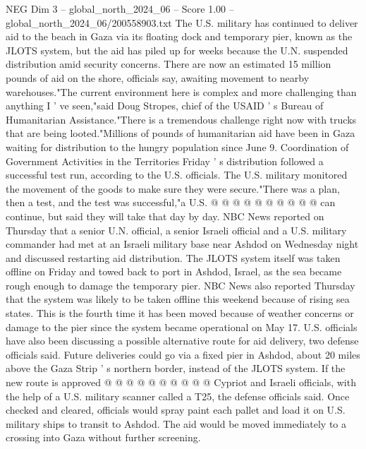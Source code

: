 \begin{textsample}{NEG Dim 3 – global\_north\_2024\_06 – Score 1.00 – global\_north\_2024\_06/200558903.txt}  \label{ex:f3_neg_381}
The U.S. military has continued to deliver aid to the beach in Gaza via its floating dock and temporary pier, known as the JLOTS system, but the aid has piled up for weeks because the U.N. suspended distribution amid security concerns.
There are now an estimated 15 million pounds of aid on the shore, officials say, awaiting movement to nearby warehouses."The current environment here is complex and more challenging than anything I ' ve seen,"said Doug Stropes, chief of the USAID ' s Bureau of Humanitarian Assistance."There is a tremendous challenge right now with trucks that are being looted."Millions of pounds of humanitarian aid have been in Gaza waiting for distribution to the hungry population since June 9.
Coordination of Government Activities in the Territories Friday ' s distribution followed a successful test run, according to the U.S. officials.
The U.S. military monitored the movement of the goods to make sure they were secure."There was a plan, then a test, and the test was successful,"a U.S. @ @ @ @ @ @ @ @ @ @ can continue, but said they will take that day by day.
NBC News reported on Thursday that a senior U.N. official, a senior Israeli official and a U.S. military commander had met at an Israeli military base near Ashdod on Wednesday night and discussed restarting aid distribution.
The JLOTS system itself was taken offline on Friday and towed back to port in Ashdod, Israel, as the sea became rough enough to damage the temporary pier.
NBC News also reported Thursday that the system was likely to be taken offline this weekend because of rising sea states.
This is the fourth time it has been moved because of weather concerns or damage to the pier since the system became operational on May 17.
U.S. officials have also been discussing a possible alternative route for aid delivery, two defense officials said.
Future deliveries could go via a fixed pier in Ashdod, about 20 miles above the Gaza Strip ' s northern border, instead of the JLOTS system.
If the new route is approved @ @ @ @ @ @ @ @ @ @ Cypriot and Israeli officials, with the help of a U.S. military scanner called a T25, the defense officials said.
Once checked and cleared, officials would spray paint each pallet and load it on U.S. military ships to transit to Ashdod.
The aid would be moved immediately to a crossing into Gaza without further screening.

\end{textsample}
